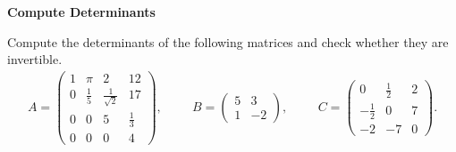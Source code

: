 \textbf{Compute Determinants}

Compute the determinants of the following matrices and check whether they are invertible.
\begin{align*}
A=\begin{pmatrix}
1&\pi&2&12\\
0&\frac{1}{5}&\frac{1}{\sqrt{2}}&17\\
0&0&5&\frac{1}{3}\\
0&0&0&4
\end{pmatrix},\hspace{1cm}
B=\begin{pmatrix}
5&3\\
1&-2
\end{pmatrix},\hspace{1cm}
C=\begin{pmatrix}
0&\frac{1}{2}&2\\
-\frac{1}{2}&0&7\\
-2&-7&0
\end{pmatrix}.
\end{align*}
